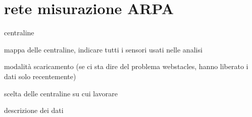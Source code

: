 \section{rete misurazione ARPA}

centraline

mappa delle centraline, indicare tutti i sensori usati nelle analisi

modalità scaricamento (se ci sta dire del problema webstacles, hanno liberato i dati solo recentemente)

scelta delle centraline su cui lavorare

descrizione dei dati
